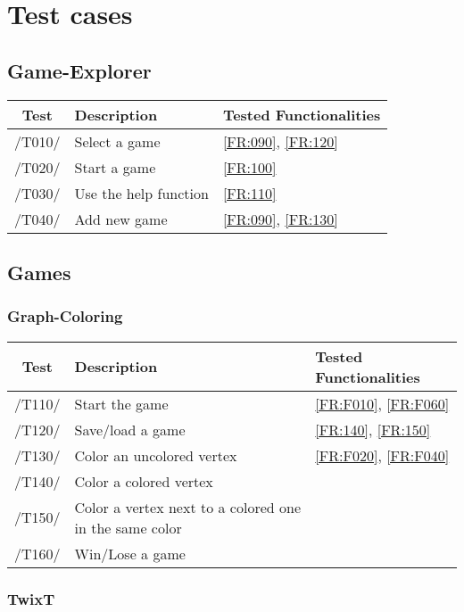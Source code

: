 \section{Test cases}

\subsection{Game-Explorer}

\begin{tabular}{cll}

\hline
\textbf{Test} & \textbf{Description} & \textbf{Tested Functionalities} \\
\hline
/T010/ & Select a game & \ref{FR:090}, \ref{FR:120} \\
/T020/ & Start a game & \ref{FR:100} \\
/T030/ & Use the help function & \ref{FR:110} \\
/T040/ & Add new game & \ref{FR:090}, \ref{FR:130} \\
\hline

\end{tabular}

\subsection{Games}

\subsubsection{Graph-Coloring}

\begin{tabular}{cll}

\hline
\textbf{Test} & \textbf{Description} & \textbf{Tested Functionalities} \\
\hline
/T110/ & Start the game & \ref{FR:F010}, \ref{FR:F060} \\
/T120/ & Save/load a game & \ref{FR:140}, \ref{FR:150}\\
/T130/ & Color an uncolored vertex & \ref{FR:F020}, \ref{FR:F040}\\
/T140/ & Color a colored vertex & \\
/T150/ & Color a vertex next to a colored one in the same color & \\
/T160/ & Win/Lose a game & \\
\hline

\end{tabular}

\subsubsection{TwixT}

